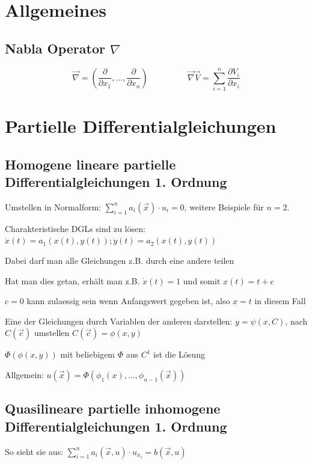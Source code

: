 \documentclass[10pt,a4paper]{article}
\newenvironment{packed_enum}{
\begin{enumerate}
  \setlength{\itemsep}{1pt}
  \setlength{\parskip}{0pt}
  \setlength{\parsep}{0pt}
}{\end{enumerate}}
\begin{document}
\section{Allgemeines}
\subsection{Nabla Operator $\nabla$}
\[
\vec{\nabla} = \left(\frac{\partial}{\partial x_1}, ..., \frac{\partial}{\partial x_n} \right)
\,\,\,\,\,\,\,\,\,\,\,\,\,\,\,\,\,\,\,\,\,\,\,\,\,\,\,\,
\vec{\nabla} \vec{V} = \sum\limits_{i=1}^n \frac{\partial V_i}{\partial x_i}
\]

\section{Partielle Differentialgleichungen}
\subsection{Homogene lineare partielle Differentialgleichungen 1. Ordnung}
\begin{packed_enum}
\item Umstellen in Normalform: $\sum\limits_{i = 1}^n a_i(\vec{x}) \cdot u_i = 0$, weitere Beispiele für $n=2$.
\item Charakteristische DGLs sind zu lösen: $\dot{x}(t) = a_1(x(t), y(t)); \dot{y}(t) = a_2(x(t), y(t))$
\begin{packed_enum}
\item Dabei darf man alle Gleichungen z.B. durch eine andere teilen
\item Hat man dies getan, erhält man z.B. $\dot{x}(t)=1$ und somit $x(t)=t+c$
\item $c=0$ kann zulaessig sein wenn Anfangswert gegeben ist, also $x=t$ in diesem Fall
\end{packed_enum}
\item Eine der Gleichungen durch Variablen der anderen darstellen: $y = \psi(x, C)$, nach $C(\vec{c})$ umstellen $C(\vec{c}) = \phi(x,y)$
\item $\Phi(\phi(x,y))$ mit beliebigem $\Phi$ aus $C^1$ ist die Lösung
\item Allgemein: $u(\vec{x}) = \Phi(\phi_1({x}), ... , \phi_{n-1}(\vec{x}))$
\end{packed_enum}

\subsection{Quasilineare partielle inhomogene Differentialgleichungen 1. Ordnung}
So sieht sie aus: $\sum\limits_{i=1}^n a_i(\vec{x}, u)\cdot u_{x_i} = b(\vec{x}, u)$
\end{document}
